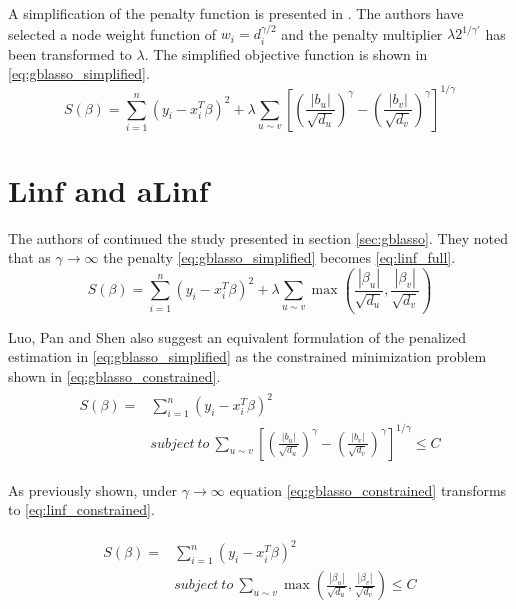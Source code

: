 A simplification of the penalty function is presented in \cite{kim2013network}. The authors have selected a node weight function of $w_i = d_i^{\gamma/2}$ and the penalty multiplier $\lambda2^{1/\gamma'}$ has been transformed to $\lambda$. The simplified objective function is shown in \ref{eq:gblasso_simplified}.
\begin{equation} \label{eq:gblasso_simplified}
S(\beta) = \sum_{i=1}^{n} (y_i - x_i^T\beta)^2 + 
\lambda\sum_{u \sim v}
\left[\left(\frac{|b_u|}{\sqrt{d_u}}\right)^\gamma-
\left(\frac{|b_v|}{\sqrt{d_v}}\right)^\gamma\right]^{1/\gamma}
\end{equation}



\section{Linf and aLinf}
The authors of \cite{luo2012two} continued the study presented in section \ref{sec:gblasso}. They noted that as $\gamma\rightarrow\infty$ the penalty \ref{eq:gblasso_simplified} becomes \ref{eq:linf_full}.
\begin{equation} \label{eq:linf_full}
S(\beta) = \sum_{i=1}^{n} (y_i - x_i^T\beta)^2 + 
\lambda\sum_{u \sim v}\max\left(\frac{|\beta_u|}{\sqrt{d_u}},\frac{|\beta_v|}{\sqrt{d_v}}\right)
\end{equation}

Luo, Pan and Shen also suggest an equivalent formulation of the penalized estimation in \ref{eq:gblasso_simplified} as the constrained minimization problem shown in \ref{eq:gblasso_constrained}.
\begin{align} \label{eq:gblasso_constrained}
\begin{split}
S(\beta) = &\sum_{i=1}^{n} (y_i - x_i^T\beta)^2 \\ 
&subject\ to\ \sum_{u \sim v}
\left[\left(\frac{|b_u|}{\sqrt{d_u}}\right)^\gamma-
\left(\frac{|b_v|}{\sqrt{d_v}}\right)^\gamma\right]^{1/\gamma}\leq C
\end{split}
\end{align}

As previously shown, under $\gamma\rightarrow\infty$ equation \ref{eq:gblasso_constrained} transforms to \ref{eq:linf_constrained}. 

\begin{align} \label{eq:linf_constrained}
\begin{split}
S(\beta) = &\sum_{i=1}^{n} (y_i - x_i^T\beta)^2 \\ 
&subject\ to\ \sum_{u \sim v}\max\left(\frac{|\beta_u|}{\sqrt{d_u}},\frac{|\beta_v|}{\sqrt{d_v}}\right)\leq C
\end{split}
\end{align}

